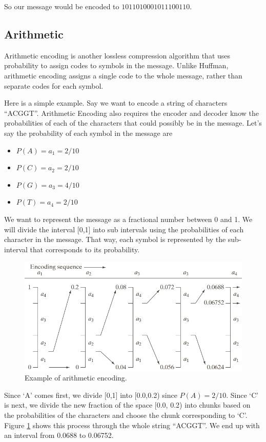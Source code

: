 \documentclass[12pt,twoside]{reedthesis}
\providecommand{\tightlist}{%
  \setlength{\itemsep}{0pt}\setlength{\parskip}{0pt}}
\begin{document}
So our message would be encoded to \(1011010001011100110\).

\hypertarget{arithmetic}{%
\subsection{Arithmetic}\label{arithmetic}}

Arithmetic encoding is another lossless compression algorithm that uses probability to assign codes to symbols in the message. Unlike Huffman, arithmetic encoding assigns a single code to the whole message, rather than separate codes for each symbol.

Here is a simple example. Say we want to encode a string of characters ``ACGGT''. Arithmetic Encoding also requires the encoder and decoder know the probabilities of each of the characters that could possibly be in the message. Let's say the probability of each symbol in the message are
\begin{itemize}
\tightlist
\item
  \(P(A) = a_1 = 2/10\)
\item
  \(P(C) = a_2 = 2/10\)
\item
  \(P(G) = a_3 = 4/10\)
\item
  \(P(T) = a_4 = 2/10\)
\end{itemize}
We want to represent the message as a fractional number between 0 and 1. We will divide the interval {[}0,1{]} into sub intervals using the probabilities of each character in the message. That way, each symbol is represented by the sub-interval that corresponds to its probability.
\begin{figure}

{\centering \includegraphics[width=0.9\linewidth]{figure/arithmeticencoding} 

}

\caption{Example of arithmetic encoding.}\label{fig:arithmeticencoding}
\end{figure}
Since `A' comes first, we divide {[}0,1{]} into {[}0.0,0.2) since \(P(A) = 2/10\). Since `C' is next, we divide the new fraction of the space {[}0.0, 0.2) into chunks based on the probabilities of the characters and choose the chunk corresponding to `C'. Figure \ref{fig:arithmeticencoding} shows this process through the whole string ``ACGGT''. We end up with an interval from 0.0688 to 0.06752.
\end{document}
